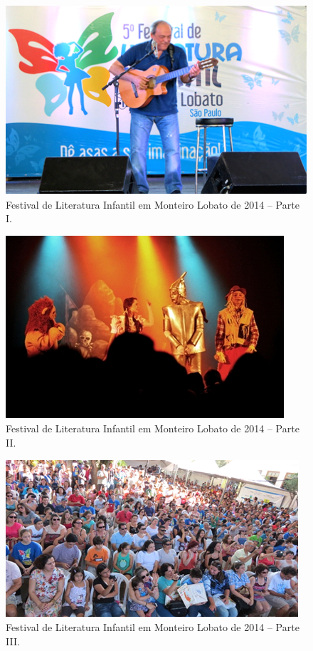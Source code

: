  \begin{figure}[h!]
 	\centering
 	\includegraphics[width=0.85\linewidth]{produtos/proddois/image20}
 	\caption{Festival de Literatura Infantil em Monteiro Lobato de 2014 – Parte I.}
 	\label{fig:image20}
 \end{figure}

 \begin{figure}[h!]
 	\centering
 	\includegraphics[width=0.85\linewidth]{produtos/proddois/image21}
 	\caption{Festival de Literatura Infantil em Monteiro Lobato de 2014 – Parte II.}
 	\label{fig:image21}
 \end{figure}

 \begin{figure}[h!]
	\centering
	\includegraphics[width=0.85\linewidth]{produtos/proddois/image22}
	\caption{Festival de Literatura Infantil em Monteiro Lobato de 2014 – Parte III.}
	\label{fig:image22}
\end{figure}

